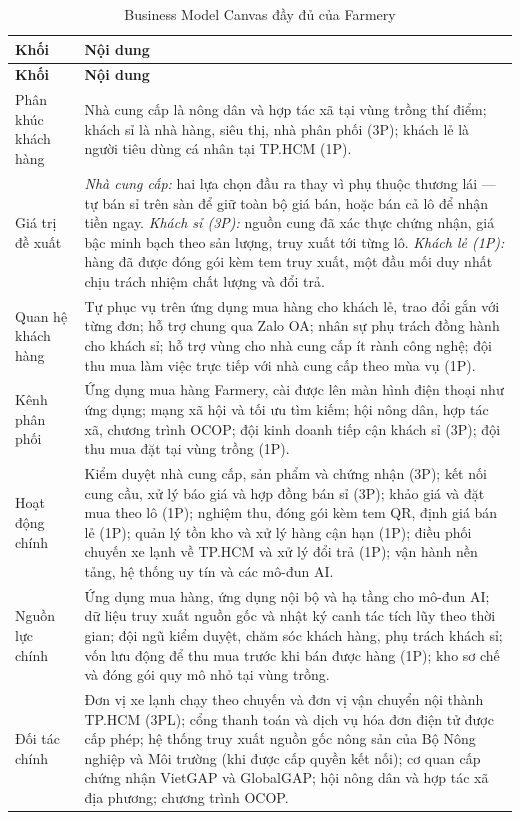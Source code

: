 \begingroup
\tblsetup
\begin{longtable}{L{3.00cm} L{12.25cm}}
\caption{Business Model Canvas đầy đủ của Farmery}
\label{tab:bmc-full} \\
\toprule
{}
\textbf{Khối} & \textbf{Nội dung} \\
\midrule
\endfirsthead
\toprule
{}
\textbf{Khối} & \textbf{Nội dung} \\
\midrule
\endhead
\bottomrule
\endfoot
Phân khúc khách hàng & Nhà cung cấp là nông dân và hợp tác xã tại vùng trồng thí điểm; khách sỉ là nhà hàng, siêu thị, nhà phân phối (3P); khách lẻ là người tiêu dùng cá nhân tại TP.HCM (1P). \\
Giá trị đề xuất & \emph{Nhà cung cấp:} hai lựa chọn đầu ra thay vì phụ thuộc thương lái --- tự bán sỉ trên sàn để giữ toàn bộ giá bán, hoặc bán cả lô để nhận tiền ngay. \emph{Khách sỉ (3P):} nguồn cung đã xác thực chứng nhận, giá bậc minh bạch theo sản lượng, truy xuất tới từng lô. \emph{Khách lẻ (1P):} hàng đã được đóng gói kèm tem truy xuất, một đầu mối duy nhất chịu trách nhiệm chất lượng và đổi trả. \\
Quan hệ khách hàng & Tự phục vụ trên ứng dụng mua hàng cho khách lẻ, trao đổi gắn với từng đơn; hỗ trợ chung qua Zalo OA; nhân sự phụ trách đồng hành cho khách sỉ; hỗ trợ vùng cho nhà cung cấp ít rành công nghệ; đội thu mua làm việc trực tiếp với nhà cung cấp theo mùa vụ (1P). \\
Kênh phân phối & Ứng dụng mua hàng Farmery, cài được lên màn hình điện thoại như ứng dụng; mạng xã hội và tối ưu tìm kiếm; hội nông dân, hợp tác xã, chương trình OCOP; đội kinh doanh tiếp cận khách sỉ (3P); đội thu mua đặt tại vùng trồng (1P). \\
Hoạt động chính & Kiểm duyệt nhà cung cấp, sản phẩm và chứng nhận (3P); kết nối cung cầu, xử lý báo giá và hợp đồng bán sỉ (3P); khảo giá và đặt mua theo lô (1P); nghiệm thu, đóng gói kèm tem QR, định giá bán lẻ (1P); quản lý tồn kho và xử lý hàng cận hạn (1P); điều phối chuyến xe lạnh về TP.HCM và xử lý đổi trả (1P); vận hành nền tảng, hệ thống uy tín và các mô-đun AI. \\
Nguồn lực chính & Ứng dụng mua hàng, ứng dụng nội bộ và hạ tầng cho mô-đun AI; dữ liệu truy xuất nguồn gốc và nhật ký canh tác tích lũy theo thời gian; đội ngũ kiểm duyệt, chăm sóc khách hàng, phụ trách khách sỉ; vốn lưu động để thu mua trước khi bán được hàng (1P); kho sơ chế và đóng gói quy mô nhỏ tại vùng trồng. \\
Đối tác chính & Đơn vị xe lạnh chạy theo chuyến và đơn vị vận chuyển nội thành TP.HCM (3PL); cổng thanh toán và dịch vụ hóa đơn điện tử được cấp phép; hệ thống truy xuất nguồn gốc nông sản của Bộ Nông nghiệp và Môi trường (khi được cấp quyền kết nối); cơ quan cấp chứng nhận VietGAP và GlobalGAP; hội nông dân và hợp tác xã địa phương; chương trình OCOP. \\

\end{longtable}
